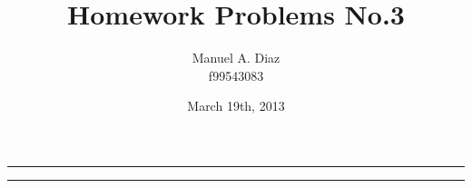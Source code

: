 \documentclass[a4paper]{memoir}
\title{\huge \textbf{Homework Problems No.3}}
\author{Manuel A. Diaz \\ f99543083}
\date{March 19th, 2013} %
\begin{document}
\thispagestyle{empty}
\begin{center}{
\begin{shaded}
\hrule \vspace{30pt}
\hspace{30pt} \thetitle  \vspace{30pt}
\newline \theauthor \hspace{30pt} \thedate  \vspace{26pt}
\hrule
\end{shaded}
}
\end{center}
\clearpage


\pagestyle{Ruled}                    %
\midsloppy                             %

\end{document}

